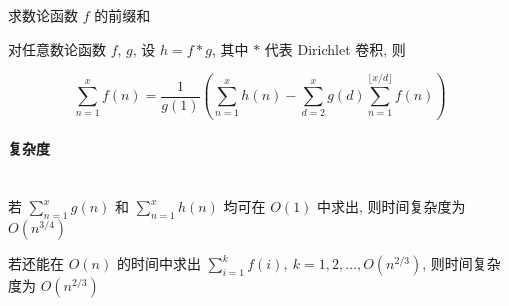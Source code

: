 求数论函数 \(f\) 的前缀和

对任意数论函数 \(f\), \(g\), 设 \(h=f*g\), 其中 \(*\) 代表 Dirichlet 卷积, 则

\[
    \sum_{n=1}^x f(n)=\frac{1}{g(1)} \left(\sum_{n=1}^x h(n)-\sum_{d=2}^xg(d)\sum_{n=1}^{\lfloor x/d\rfloor}f(n)\right)
\]

\paragraph{复杂度}~\\

若 \(\sum_{n=1}^x g(n)\) 和 \(\sum_{n=1}^x h(n)\) 均可在 \(O(1)\) 中求出, 则时间复杂度为 \(O\left(n^{3/4}\right)\)

若还能在 \(O(n)\) 的时间中求出 \(\sum_{i=1}^k f(i),~k=1,2,\dots,O\left(n^{2/3}\right)\), 则时间复杂度为 \(O\left(n^{2/3}\right)\)
